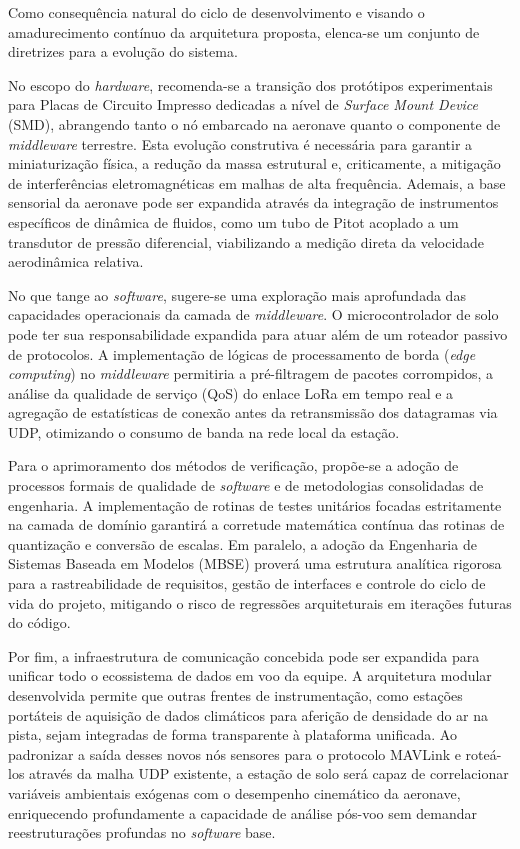 Como consequência natural do ciclo de desenvolvimento e visando o amadurecimento contínuo da arquitetura proposta, elenca-se um conjunto de diretrizes para a evolução do sistema. 

No escopo do \textit{hardware}, recomenda-se a transição dos protótipos experimentais para Placas de Circuito Impresso dedicadas a nível de \textit{Surface Mount Device} (SMD), abrangendo tanto o nó embarcado na aeronave quanto o componente de \textit{middleware} terrestre. Esta evolução construtiva é necessária para garantir a miniaturização física, a redução da massa estrutural e, criticamente, a mitigação de interferências eletromagnéticas em malhas de alta frequência. Ademais, a base sensorial da aeronave pode ser expandida através da integração de instrumentos específicos de dinâmica de fluidos, como um tubo de Pitot acoplado a um transdutor de pressão diferencial, viabilizando a medição direta da velocidade aerodinâmica relativa.

No que tange ao \textit{software}, sugere-se uma exploração mais aprofundada das capacidades operacionais da camada de \textit{middleware}. O microcontrolador de solo pode ter sua responsabilidade expandida para atuar além de um roteador passivo de protocolos. A implementação de lógicas de processamento de borda (\textit{edge computing}) no \textit{middleware} permitiria a pré-filtragem de pacotes corrompidos, a análise da qualidade de serviço (QoS) do enlace LoRa em tempo real e a agregação de estatísticas de conexão antes da retransmissão dos datagramas via UDP, otimizando o consumo de banda na rede local da estação.

Para o aprimoramento dos métodos de verificação, propõe-se a adoção de processos formais de qualidade de \textit{software} e de metodologias consolidadas de engenharia. A implementação de rotinas de testes unitários focadas estritamente na camada de domínio garantirá a corretude matemática contínua das rotinas de quantização e conversão de escalas. Em paralelo, a adoção da Engenharia de Sistemas Baseada em Modelos (MBSE) proverá uma estrutura analítica rigorosa para a rastreabilidade de requisitos, gestão de interfaces e controle do ciclo de vida do projeto, mitigando o risco de regressões arquiteturais em iterações futuras do código.

Por fim, a infraestrutura de comunicação concebida pode ser expandida para unificar todo o ecossistema de dados em voo da equipe. A arquitetura modular desenvolvida permite que outras frentes de instrumentação, como estações portáteis de aquisição de dados climáticos para aferição de densidade do ar na pista, sejam integradas de forma transparente à plataforma unificada. Ao padronizar a saída desses novos nós sensores para o protocolo MAVLink e roteá-los através da malha UDP existente, a estação de solo será capaz de correlacionar variáveis ambientais exógenas com o desempenho cinemático da aeronave, enriquecendo profundamente a capacidade de análise pós-voo sem demandar reestruturações profundas no \textit{software} base.

